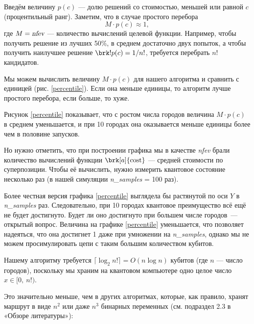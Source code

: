 Введём величину $p(c)$ --- долю решений со стоимостью, меньшей или равной $c$ (процентильный ранг). Заметим, что в случае простого перебора
$$
M \cdot p(c) \approx 1,
$$
где $M = \textsl{nfev}$ --- количество вычислений целевой функции. Например, чтобы получить решение из лучших 50\%, в среднем достаточно двух попыток, а чтобы получить наилучшее решение $\brk!{p(c) = 1/n!}$, требуется перебрать $n!$ кандидатов.

Мы можем вычислить величину $M \cdot p(c)$ для нашего алгоритма и сравнить с единицей (рис. \ref{percentile}). Если она меньше единицы, то алгоритм лучше простого перебора, если больше, то хуже.


Рисунок \ref{percentile} показывает, что с ростом числа городов величина $M \cdot p(c)$ в среднем уменьшается, и при 10 городах она оказывается меньше единицы более чем в половине запусков. 

Но нужно отметить, что при построении графика мы в качестве \textsl{nfev} брали количество вычислений функции $\brk[a]{\text{cost}}$ --- средней стоимости по суперпозиции. Чтобы её вычислить, нужно измерить квантовое состояние несколько раз (в нашей симуляции \textsl{n\_samples} = 100 раз). 

Более честная версия графика \ref{percentile} выглядела бы растянутой по оси $Y$ в \textsl{n\_samples} раз. Следовательно, при 10 городах квантовое преимущество всё ещё не будет достигнуто. Будет ли оно достигнуто при большем числе городов~--- открытый вопрос. Величина на графике \ref{percentile} уменьшается, что позволяет надеяться, что она достигнет 1 даже при умножении на \textsl{n\_samples}, однако мы не можем просимулировать цепи с таким большим количеством кубитов.


Нашему алгоритму требуется $\lceil \log_2 n! \rceil = O(n \log n)$ кубитов (где $n$ --- число городов), поскольку мы храним на квантовом компьютере одно целое число $x \in [0,\ n!)$.

Это значительно меньше, чем в других алгоритмах, которые, как правило, хранят маршрут в виде $n^2$ или даже $n^3$ бинарных переменных (см. подраздел 2.3 в «Обзоре литературы»):

